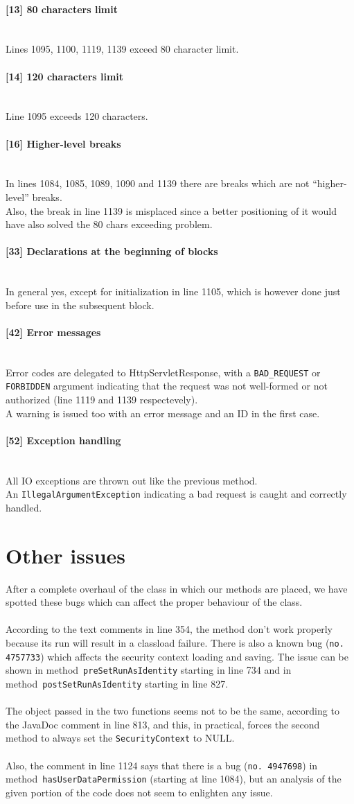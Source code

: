 \documentclass[a4paper, 11pt]{article}
\newcommand{\code}[1]{\texttt{#1}}
\newcommand{\issue}[3][?]{
    \paragraph{[#1] #2} \mbox{}\\ #3
}
\begin{document}
\issue[13]{80 characters limit}{
    Lines 1095, 1100, 1119, 1139 exceed 80 character limit.
}

\issue[14]{120 characters limit} {
    Line 1095 exceeds 120 characters.
}

\issue[16]{Higher-level breaks} {
In lines 1084, 1085, 1089, 1090 and 1139 there are breaks which are not
``higher-level''  breaks. \\
Also, the break in line 1139 is misplaced since a better positioning of it 
would have also solved the 80 chars exceeding problem.
}

\issue[33]{Declarations at the beginning of blocks} {
In general yes, except for initialization in line 1105, which is however done 
just before use in the subsequent block.
}

\issue[42]{Error messages} {
Error codes are delegated to HttpServletResponse, with a \code{BAD\_REQUEST}
or \code{FORBIDDEN} argument indicating that the request was not well-formed 
or not authorized (line 1119 and 1139 respectevely). \\ 
A warning is issued too with an error message and an ID in the first case.
}

\issue[52]{Exception handling} {
All IO exceptions are thrown out like the previous method. \\
An \code{IllegalArgumentException} indicating a bad request is caught 
and correctly handled.
}


\newpage
\section{Other issues}

After a complete overhaul of the class in which our methods are placed, we have
spotted these bugs which can affect the proper behaviour of the class. \\ \\
According to the text comments in line 354, the method don't work properly 
because its run will result in a classload failure.
There is also a known bug (\texttt{no. 4757733}) which affects the security 
context loading and saving. The issue can be shown in 
method~\texttt{preSetRunAsIdentity} starting in line 734 and in
method~\texttt{postSetRunAsIdentity} starting in line 827. \\ \\
The object passed in the two functions seems not to be the same, according to 
the JavaDoc comment in line 813, and this, in practical, forces the second 
method to always set the \texttt{SecurityContext} to NULL. \\ \\
Also, the comment in line 1124 says that there is a bug (\texttt{no. 4947698}) 
in method~\texttt{hasUserDataPermission} (starting at line 1084), 
but an analysis of the given portion of the code does not seem 
to enlighten any issue.
\end{document}
